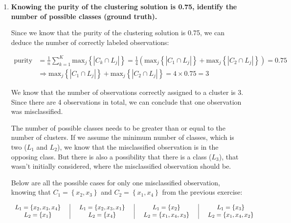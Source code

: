 \documentclass[12pt]{article}
\begin{document}
\begin{enumerate}[leftmargin=\labelsep]
  \item \textbf{Knowing the purity of the clustering solution is 0.75, identify the number of possible classes (ground truth).}

        \vskip 0.3cm
        Since we know that the purity of the clustering solution is 0.75, we can deduce the number of correctly labeled observations:

        \vskip -0.5cm
        \begin{align*}
          \text{purity} & = \frac{1}{n} \sum_{k=1}^K \text{max}_j\left\{\left|C_k \cap L_j\right|\right\}
          = \frac{1}{4} \left(\text{max}_j\left\{\left|C_1 \cap L_j\right|\right\} + \text{max}_j\left\{\left|C_2 \cap L_j\right|\right\}\right) = 0.75               \\
                        & \Rightarrow \text{max}_j\left\{\left|C_1 \cap L_j\right|\right\} + \text{max}_j\left\{\left|C_2 \cap L_j\right|\right\} = 4 \times 0.75 = 3
        \end{align*}

        We know that the number of observations correctly assigned to a cluster is 3. Since there are 4 observations in total, we can conclude that one observation was
        misclassified.

        The number of possible classes needs to be greater than or equal to the number of clusters. If we assume the minimum number of classes, which is two ($L_1$ and $L_2$),
        we know that the misclassified observation is in the opposing class. But there is also a possibility that there is a class ($L_3$), that wasn't initially considered,
        where the misclassified observation should be.

        Below are all the possible cases for only one misclassified observation, knowing that $C_1 = \left\{x_2, x_3\right\}$ and $C_2 = \left\{x_1, x_4\right\}$ from the previous exercise:

        \begin{equation}\label{exI4-purity-cases-1}
          \begin{array}{c|c|c|c}
            \centering
            L_1 = \left\{x_2, x_3, x_4\right\} \quad & \quad L_1 = \left\{x_2, x_3, x_1\right\} \quad & \quad L_1 = \left\{x_2\right\} \quad           & \quad L_1 = \left\{x_3\right\}           \\
            L_2 = \left\{x_1\right\} \quad           & \quad L_2 = \left\{x_4\right\} \quad           & \quad L_2 = \left\{x_1, x_4, x_3\right\} \quad & \quad L_2 = \left\{x_1, x_4, x_2\right\}
          \end{array}
        \end{equation}


\end{enumerate}
\end{document}
